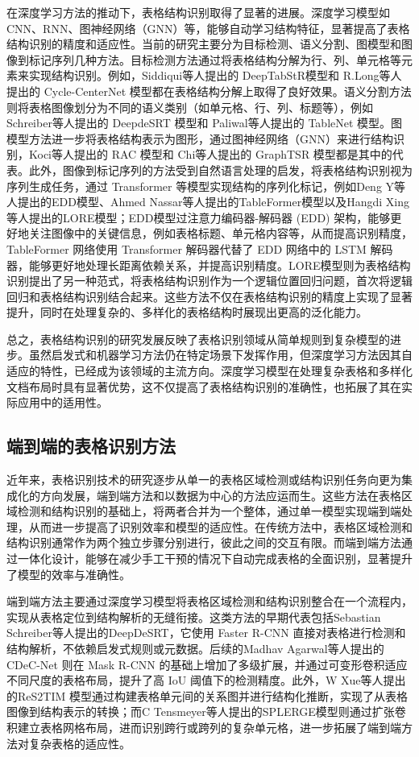 \documentclass[UTF8,12pt, AutoFakeBold,fontset = founder]{ctexart}
\begin{document}
在深度学习方法的推动下，表格结构识别取得了显著的进展。深度学习模型如 CNN、RNN、图神经网络（GNN）等，能够自动学习结构特征，显著提高了表格结构识别的精度和适应性。当前的研究主要分为目标检测、语义分割、图模型和图像到标记序列几种方法。目标检测方法通过将表格结构分解为行、列、单元格等元素来实现结构识别。例如，Siddiqui\cite{b3}等人提出的 DeepTabStR模型和 R.Long\cite{b3}等人提出的 Cycle-CenterNet 模型都在表格结构分解上取得了良好效果。语义分割方法则将表格图像划分为不同的语义类别（如单元格、行、列、标题等），例如 Schreiber\cite{b3}等人提出的 DeepdeSRT 模型和 Paliwal\cite{b3}等人提出的 TableNet 模型。图模型方法进一步将表格结构表示为图形，通过图神经网络（GNN）来进行结构识别，Koci\cite{b3}等人提出的 RAC 模型和 Chi\cite{b3}等人提出的 GraphTSR 模型都是其中的代表。此外，图像到标记序列的方法受到自然语言处理的启发，将表格结构识别视为序列生成任务，通过 Transformer 等模型实现结构的序列化标记，例如Deng Y\cite{b3}等人提出的EDD模型、Ahmed Nassar\cite{b3}等人提出的TableFormer模型以及Hangdi Xing\cite{b3}等人提出的LORE模型；EDD模型过注意力编码器-解码器 (EDD) 架构，能够更好地关注图像中的关键信息，例如表格标题、单元格内容等，从而提高识别精度，TableFormer 网络使用 Transformer 解码器代替了 EDD 网络中的 LSTM 解码器，能够更好地处理长距离依赖关系，并提高识别精度。LORE模型则为表格结构识别提出了另一种范式，将表格结构识别作为一个逻辑位置回归问题，首次将逻辑回归和表格结构识别结合起来。这些方法不仅在表格结构识别的精度上实现了显著提升，同时在处理复杂的、多样化的表格结构时展现出更高的泛化能力。

总之，表格结构识别的研究发展反映了表格识别领域从简单规则到复杂模型的进步。虽然启发式和机器学习方法仍在特定场景下发挥作用，但深度学习方法因其自适应的特性，已经成为该领域的主流方向。深度学习模型在处理复杂表格和多样化文档布局时具有显著优势，这不仅提高了表格结构识别的准确性，也拓展了其在实际应用中的适用性。

\subsection{端到端的表格识别方法}

近年来，表格识别技术的研究逐步从单一的表格区域检测或结构识别任务向更为集成化的方向发展，端到端方法和以数据为中心的方法应运而生。这些方法在表格区域检测和结构识别的基础上，将两者合并为一个整体，通过单一模型实现端到端处理，从而进一步提高了识别效率和模型的适应性。在传统方法中，表格区域检测和结构识别通常作为两个独立步骤分别进行，彼此之间的交互有限。而端到端方法通过一体化设计，能够在减少手工干预的情况下自动完成表格的全面识别，显著提升了模型的效率与准确性。

端到端方法主要通过深度学习模型将表格区域检测和结构识别整合在一个流程内，实现从表格定位到结构解析的无缝衔接。这类方法的早期代表包括Sebastian Schreiber\cite{b2}等人提出的DeepDeSRT，它使用 Faster R-CNN 直接对表格进行检测和结构解析，不依赖启发式规则或元数据。后续的Madhav Agarwal\cite{b2}等人提出的CDeC-Net 则在 Mask R-CNN 的基础上增加了多级扩展，并通过可变形卷积适应不同尺度的表格布局，提升了高 IoU 阈值下的检测精度。此外，W Xue\cite{b2}等人提出的ReS2TIM 模型通过构建表格单元间的关系图并进行结构化推断，实现了从表格图像到结构表示的转换；而C Tensmeyer\cite{b2}等人提出的SPLERGE模型则通过扩张卷积建立表格网格布局，进而识别跨行或跨列的复杂单元格，进一步拓展了端到端方法对复杂表格的适应性。
\end{document}
